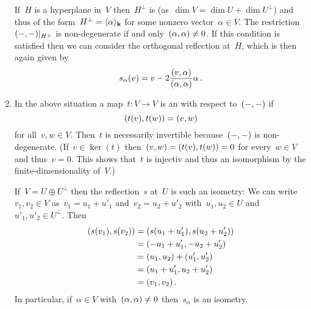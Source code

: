 \begin{recall}
\begin{enumerate}
      If~$H$ is a hyperplane in~$V$ then~$H^{\perp}$ is {\onedimensional} (as~$\dim V = \dim U + \dim U^\perp$) and thus of the form~$H^{\perp} = \langle\alpha\rangle_{\mathbf{k}}$ for some nonzero vector~$\alpha \in V$.
      The restriction~$\restrict{\inner{-,-}}{H^\perp}$ is non-degenerate if and only~$(\alpha, \alpha) \neq 0$.
      If this condition is satisfied then we can consider the orthogonal reflection at~$H$, which is then again given by
      \[
        s_\alpha(v)
        =
        v - 2 \frac{(v,\alpha)}{(\alpha,\alpha)} \alpha \,.
      \]
    \item
      In the above situation a map~$t \colon V \to V$ is an  with respect to~$(-,-)$ if
      \[
        (t(v), t(w))
        =
        (v,w)
      \]
      for all~$v, w \in V$.
      Then~$t$ is necessarily invertible because~$(-,-)$ is non-degenerate.
      (If~$v \in \ker(t)$ then~$(v,w) = (t(v),t(w)) = 0$ for every~$w \in V$ and thus~$v = 0$.
      This shows that~$t$ is injectiv and thus an isomorphism by the finite-dimensionality of~$V$.)
      
      If~$V = U \oplus U^\perp$ then the reflection~$s$ at~$U$ is such an isometry:
      We can write~$v_1, v_2 \in V$ as~$v_1 = u_1 + u'_1$ and~$v_2 = u_2 + u'_2$ with~$u_1, u_2 \in U$ and~$u'_1, u'_2 \in U^\perp$.
      Then
      \begin{align*}
        (s(v_1), s(v_2))
        &=
        (s(u_1 + u'_1), s(u_2 + u'_2))
        \\
        &=
        (-u_1 + u'_1, -u_2 + u'_2)
        \\
        &=
        (u_1, u_2) + (u'_1, u'_2)
        \\
        &=
        (u_1 + u'_1, u_2 + u'_2)
        \\
        &=
        (v_1, v_2) \,.
      \end{align*}
      In particular, if~$\alpha \in V$ with~$(\alpha, \alpha) \neq 0$ then~$s_\alpha$ is an isometry.
      

\end{enumerate}
\end{recall}
